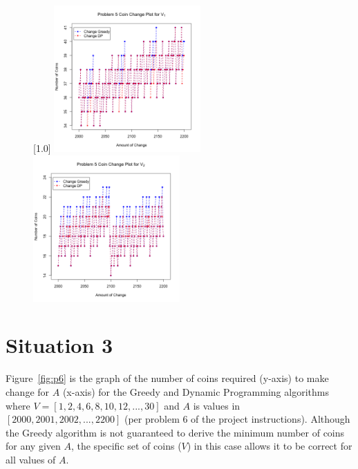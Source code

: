 \documentclass[11pt]{scrreprt}
\begin{document}
\begin{figure}[!htbp]
	\captionsetup{justification=centering,singlelinecheck=off}
	\captionsetup[subfigure]{singlelinecheck=on}
	[1.0\textwidth]
	{%
		\includegraphics[width=0.50\textwidth]{situation2_1.png}%
		\includegraphics[width=0.50\textwidth]{situation2_2.png}
	}%
\end{figure}


\section{Situation 3}

Figure~\ref{fig:p6} is the graph of the number of coins required (y-axis) to make change for $A$ (x-axis) for the Greedy and Dynamic Programming algorithms where $V = [1, 2, 4, 6, 8, 10, 12, ..., 30]$ and $A$ is values in $[2000, 2001, 2002, ..., 2200]$ (per problem 6 of the project instructions). Although the Greedy algorithm is not guaranteed to derive the minimum number of coins for any given $A$, the specific set of coins ($V$) in this case allows it to be correct for all values of $A$.
\end{document}
